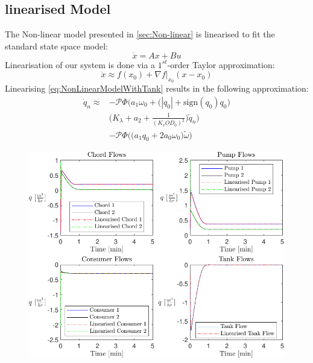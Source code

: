 \subsection{linearised Model}
The Non-linear model presented in \cref{sec:Non-linear} is linearised to fit the standard state space model:
\begin{equation*}
	\dot{x}=Ax+Bu
\end{equation*}
Linearisation of our system is done via a $ 1^{st} $-order Taylor approximation: 
\begin{equation}\label{eq:TaylorSeries}
	\dot{x} \approx f(x_0) + \nabla f\bigg\rvert_{x_0} (x-x_0)
\end{equation}
Linearising \cref{eq:NonLinearModelWithTank} results in the following approximation:
\begin{equation}\label{eq:LinearisedModelWithTank}
	\begin{split}
	\dot{q}_n \approx &-\mathcal{P}\Phi\Bigg(a_1\omega_0 + \Big(|q_0|+\text{sign}(q_0)q_0\Big)\\
	&\Bigg(K_\lambda + a_2 + \frac{1}{(K_v OD_0)^2}\Bigg) \tilde{q}_n \Bigg)\\
	&- \mathcal{P}\Phi\Bigg(\Big(a_1 q_0 + 2a_0\omega_0\Big) \tilde{\omega}\Bigg)
	\end{split}
\end{equation}

\begin{figure}[h]
	\centering
	\includegraphics[width=\linewidth]{Graphics/NominalFlows.pdf}
\end{figure}
